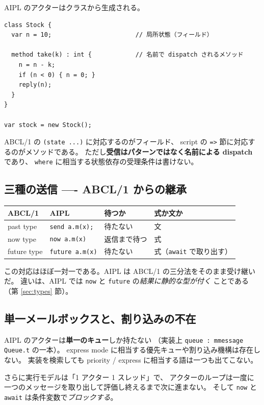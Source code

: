 \documentclass[11pt,a4paper]{ltjsarticle}
\theoremstyle{remark}
\begin{document}
AIPL のアクターはクラスから生成される。

\begin{lstlisting}[language=AIPL]
class Stock {
  var n = 10;                       // 局所状態（フィールド）

  method take(k) : int {            // 名前で dispatch されるメソッド
    n = n - k;
    if (n < 0) { n = 0; }
    reply(n);
  }
}

var stock = new Stock();
\end{lstlisting}

ABCL/1 の \texttt{(state ...)} に対応するのがフィールド、
script の \texttt{=>} 節に対応するのがメソッドである。
ただし\textbf{受信はパターンではなく名前による dispatch} であり、
\texttt{where} に相当する状態依存の受理条件は書けない。

\subsection{三種の送信 ---- ABCL/1 からの継承}

\begin{center}
\begin{tabular}{@{}llll@{}}
\toprule
ABCL/1 & AIPL & 待つか & 式か文か \\
\midrule
past type   & \texttt{send a.m(x);}   & 待たない & 文 \\
now type    & \texttt{now a.m(x)}     & 返信まで待つ & 式 \\
future type & \texttt{future a.m(x)}  & 待たない & 式（\texttt{await} で取り出す） \\
\bottomrule
\end{tabular}
\end{center}

この対応はほぼ一対一である。AIPL は ABCL/1 の三分法をそのまま受け継いだ。
違いは、AIPL では \texttt{now} と \texttt{future} の\emph{結果に静的な型が付く}
ことである（第 \ref{sec:types} 節）。

\subsection{単一メールボックスと、割り込みの不在}

AIPL のアクターは\textbf{単一のキュー}しか持たない
（実装上 \texttt{queue : mmessage Queue.t} の一本）。
express mode に相当する優先キューや割り込み機構は存在しない。
実装を検索しても priority / express に相当する語は一つも出てこない。

さらに実行モデルは「1 アクター 1 スレッド」で、
アクターのループは一度に一つのメッセージを取り出して評価し終えるまで次に進まない。
そして \texttt{now} と \texttt{await} は条件変数で\emph{ブロックする}。
\end{document}
